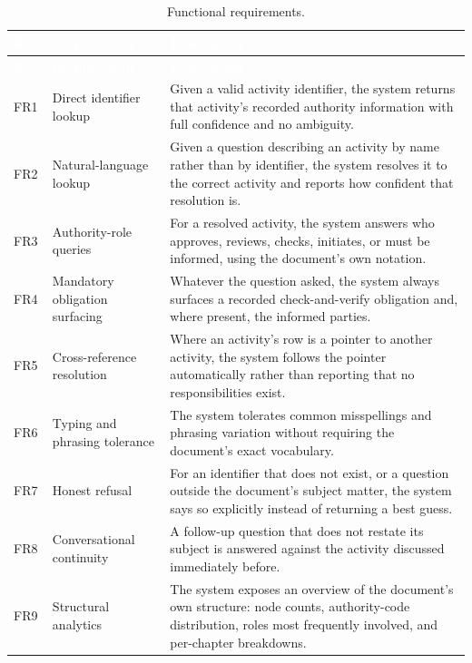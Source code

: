 \begin{longtable}{|p{}|p{}|p{}|}
\caption{Functional requirements.}\label{tab:fr}\\
\hline
\rowcolor{thesisgreen}\textcolor{white}{\textbf{Ref.}} & \textcolor{white}{\textbf{Requirement}} & \textcolor{white}{\textbf{Description}} \\
\hline
\endfirsthead
\hline
\rowcolor{thesisgreen}\textcolor{white}{\textbf{Ref.}} & \textcolor{white}{\textbf{Requirement}} & \textcolor{white}{\textbf{Description}} \\
\hline
\endhead
FR1 & Direct identifier lookup & Given a valid activity identifier, the system returns that activity's recorded authority information with full confidence and no ambiguity. \\ \hline
FR2 & Natural-language lookup & Given a question describing an activity by name rather than by identifier, the system resolves it to the correct activity and reports how confident that resolution is. \\ \hline
FR3 & Authority-role queries & For a resolved activity, the system answers who approves, reviews, checks, initiates, or must be informed, using the document's own notation. \\ \hline
FR4 & Mandatory obligation surfacing & Whatever the question asked, the system always surfaces a recorded check-and-verify obligation and, where present, the informed parties. \\ \hline
FR5 & Cross-reference resolution & Where an activity's row is a pointer to another activity, the system follows the pointer automatically rather than reporting that no responsibilities exist. \\ \hline
FR6 & Typing and phrasing tolerance & The system tolerates common misspellings and phrasing variation without requiring the document's exact vocabulary. \\ \hline
FR7 & Honest refusal & For an identifier that does not exist, or a question outside the document's subject matter, the system says so explicitly instead of returning a best guess. \\ \hline
FR8 & Conversational continuity & A follow-up question that does not restate its subject is answered against the activity discussed immediately before. \\ \hline
FR9 & Structural analytics & The system exposes an overview of the document's own structure: node counts, authority-code distribution, roles most frequently involved, and per-chapter breakdowns. \\ \hline

\end{longtable}
